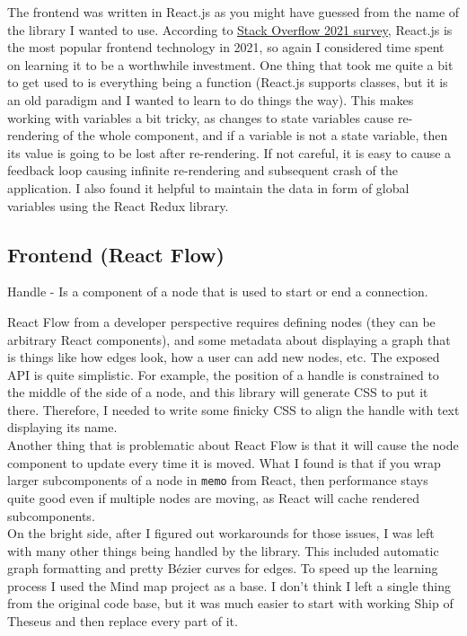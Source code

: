 \documentclass[12pt]{report}
\begin{document}
The frontend was written in React.js as you might have guessed from the name of the library I wanted to use. According to \href{https://insights.stackoverflow.com/survey/2021#most-popular-technologies-webframe}{Stack Overflow 2021 survey}\cite{StackSurvey}, React.js is the most popular frontend technology in 2021, so again I considered time spent on learning it to be a worthwhile investment. One thing that took me quite a bit to get used to is everything being a function (React.js supports classes, but it is an old paradigm and I wanted to learn to do things the  way). This makes working with variables a bit tricky, as changes to state variables cause re-rendering of the whole component, and if a variable is not a state variable, then its value is going to be lost after re-rendering. If not careful, it is easy to cause a feedback loop causing infinite re-rendering and subsequent crash of the application. I also found it helpful to maintain the data in form of global variables using the React Redux library.
\subsection{Frontend (React Flow)}

\begin{tcolorbox}[title=Vocabulary]
Handle - Is a component of a node that is used to start or end a connection.
\end{tcolorbox}
React Flow from a developer perspective requires defining nodes (they can be arbitrary React components), and some metadata about displaying a graph that is things like how edges look, how a user can add new nodes, etc. 
The exposed API is quite simplistic. 
For example, the position of a handle is constrained to the middle of the side of a node, and this library will generate CSS to put it there. 
Therefore, I needed to write some finicky CSS to align the handle with text displaying its name.
\\
Another thing that is problematic about React Flow is that it will cause the node component to update every time it is moved.
What I found is that if you wrap larger subcomponents of a node in \verb!memo! from React, then performance stays quite good even if multiple nodes are moving, as React will cache rendered subcomponents.
\\
On the bright side, after I figured out workarounds for those issues, I was left with many other things being handled by the library. This included automatic graph formatting and pretty Bézier curves for edges. To speed up the learning process I used the Mind map project\cite{MindMap} as a base. I don't think I left a single thing from the original code base, but it was much easier to start with working Ship of Theseus\cite{Ship}  and then replace every part of it. 
\end{document}
